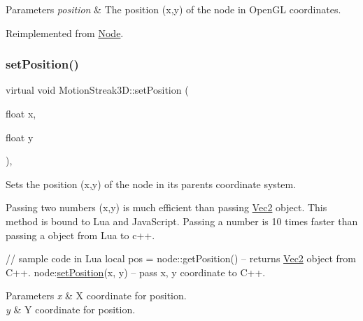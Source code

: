 \begin{DoxyParams}{Parameters}
{\em position} & The position (x,y) of the node in Open\+GL coordinates. \\
\hline
\end{DoxyParams}


Reimplemented from \hyperlink{classNode_a8ffbf25763ef5f15eeae7227779505bc}{Node}.

\mbox{\label{classMotionStreak3D_af19878b923b0caae1704f93a9ee21699}} 
\subsubsection{\texorpdfstring{set\+Position()}{setPosition()}\hspace{0.1cm}{\footnotesize\ttfamily [4/4]}}
{\footnotesize\ttfamily virtual void Motion\+Streak3\+D\+::set\+Position (\begin{DoxyParamCaption}\item[{float}]{x,  }\item[{float}]{y }\end{DoxyParamCaption})\hspace{0.3cm}{\ttfamily [override]}, {\ttfamily [virtual]}}

Sets the position (x,y) of the node in its parent\textquotesingle{}s coordinate system.

Passing two numbers (x,y) is much efficient than passing \hyperlink{classVec2}{Vec2} object. This method is bound to Lua and Java\+Script. Passing a number is 10 times faster than passing a object from Lua to c++.


\begin{DoxyCode}
\textcolor{comment}{// sample code in Lua}
local pos  = node::getPosition()  -- returns \hyperlink{classVec2}{Vec2} \textcolor{keywordtype}{object} from C++.
node:\hyperlink{classMotionStreak3D_a8e4698c3850e094f90600e3ba4604651}{setPosition}(x, y)            -- pass x, y coordinate to C++.
\end{DoxyCode}



\begin{DoxyParams}{Parameters}
{\em x} & X coordinate for position. \\
\hline
{\em y} & Y coordinate for position. \\
\hline
\end{DoxyParams}


